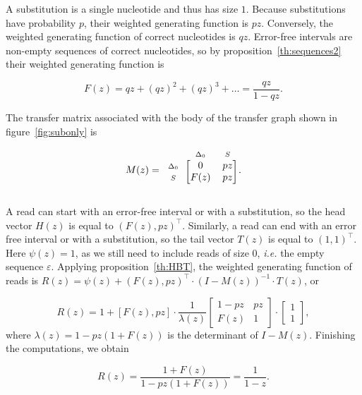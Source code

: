 \documentclass{article}
\newcommand{\smS}{\scriptstyle{S}}
\newcommand{\smDELz}{\scriptstyle{\Delta_0}}
\begin{document}
A substitution is a single nucleotide and thus has size $1$. Because
substitutions have probability $p$, their weighted generating function is
$pz$. Conversely, the weighted generating function of correct nucleotides
is $qz$. Error-free intervals are non-empty sequences of correct
nucleotides, so by proposition~\ref{th:sequences2} their weighted
generating function is

\begin{equation}
\label{eq:Fsub}
F(z) = qz + (qz)^2 + (qz)^3 + \ldots = \frac{qz}{1-qz}.
\end{equation}

The transfer matrix associated with the body of the transfer graph shown
in figure~\ref{fig:subonly} is

\begin{equation*}
M(z) = 
\begin{blockarray}{ccc}
       & \smDELz & \smS \\
\begin{block}{c[cc]}
\smDELz & 0    & pz \\
\smS    & F(z) & pz \\
\end{block}
\end{blockarray}.
\end{equation*}


A read can start with an error-free interval or with a substitution, so
the head vector $H(z)$ is equal to $(F(z), pz)^\top$. Similarly, a read
can end with an error free interval or with a substitution, so the tail
vector $T(z)$ is equal to $(1,1)^\top$. Here $\psi(z) = 1$, as we still
need to include reads of size $0$, \textit{i.e.} the empty sequence
$\varepsilon$. Applying proposition~\ref{th:HBT}, the weighted generating
function of reads is $R(z) = \psi(z) + (F(z), pz)^\top \cdot (I-M(z))^{-1}
\cdot T(z)$, or

\begin{equation*}
R(z) = 1 + [F(z), pz] \cdot
\frac{1}{\lambda(z)}
\begin{bmatrix}
1-pz & pz   \\
F(z) & 1
\end{bmatrix}
\cdot \begin{bmatrix}1 \\ 1\end{bmatrix},
\end{equation*}
where $\lambda(z) = 1-pz(1+F(z))$ is the determinant of $I-M(z)$.
Finishing the computations, we obtain

\begin{equation}
\label{eq:Rsub}
R(z) = \frac{1+F(z)}{1-pz(1+F(z))} = \frac{1}{1-z}.
\end{equation}
\end{document}
